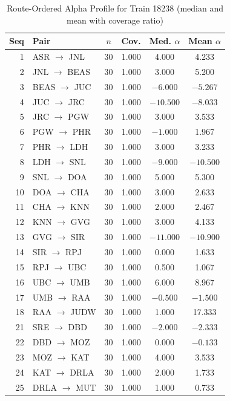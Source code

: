 \documentclass[conference]{IEEEtran}
\begin{document}
\begin{table}[!t]
\centering
\caption{Route-Ordered Alpha Profile for Train 18238 (median and mean with coverage ratio)}
\label{tab:route_alpha}
\scriptsize
\setlength{\tabcolsep}{5pt}
\renewcommand{\arraystretch}{0.94}
\begin{minipage}[t]{0.485\textwidth}
\centering
\begin{tabular}{@{}rlcccc@{}}
\toprule
Seq & Pair & $n$ & Cov. & Med. $\alpha$ & Mean $\alpha$ \\
\midrule
1 & ASR $\to$ JNL & 30 & 1.000 & 4.000 & 4.233 \\
2 & JNL $\to$ BEAS & 30 & 1.000 & 3.000 & 5.200 \\
3 & BEAS $\to$ JUC & 30 & 1.000 & $-6.000$ & $-5.267$ \\
4 & JUC $\to$ JRC & 30 & 1.000 & $-10.500$ & $-8.033$ \\
5 & JRC $\to$ PGW & 30 & 1.000 & 3.000 & 3.533 \\
6 & PGW $\to$ PHR & 30 & 1.000 & $-1.000$ & 1.967 \\
7 & PHR $\to$ LDH & 30 & 1.000 & 3.000 & 3.233 \\
8 & LDH $\to$ SNL & 30 & 1.000 & $-9.000$ & $-10.500$ \\
9 & SNL $\to$ DOA & 30 & 1.000 & 5.000 & 5.300 \\
10 & DOA $\to$ CHA & 30 & 1.000 & 3.000 & 2.633 \\
11 & CHA $\to$ KNN & 30 & 1.000 & 2.000 & 2.467 \\
12 & KNN $\to$ GVG & 30 & 1.000 & 3.000 & 4.133 \\
13 & GVG $\to$ SIR & 30 & 1.000 & $-11.000$ & $-10.900$ \\
14 & SIR $\to$ RPJ & 30 & 1.000 & 0.000 & 1.633 \\
15 & RPJ $\to$ UBC & 30 & 1.000 & 0.500 & 1.067 \\
16 & UBC $\to$ UMB & 30 & 1.000 & 6.000 & 8.967 \\
17 & UMB $\to$ RAA & 30 & 1.000 & $-0.500$ & $-1.500$ \\
18 & RAA $\to$ JUDW & 30 & 1.000 & 1.000 & 17.333 \\
21 & SRE $\to$ DBD & 30 & 1.000 & $-2.000$ & $-2.333$ \\
22 & DBD $\to$ MOZ & 30 & 1.000 & 0.000 & $-0.133$ \\
23 & MOZ $\to$ KAT & 30 & 1.000 & 4.000 & 3.533 \\
24 & KAT $\to$ DRLA & 30 & 1.000 & 2.000 & 1.733 \\
25 & DRLA $\to$ MUT & 30 & 1.000 & 1.000 & 0.733 \\

\end{tabular}
\end{minipage}
\end{table}
\end{document}
